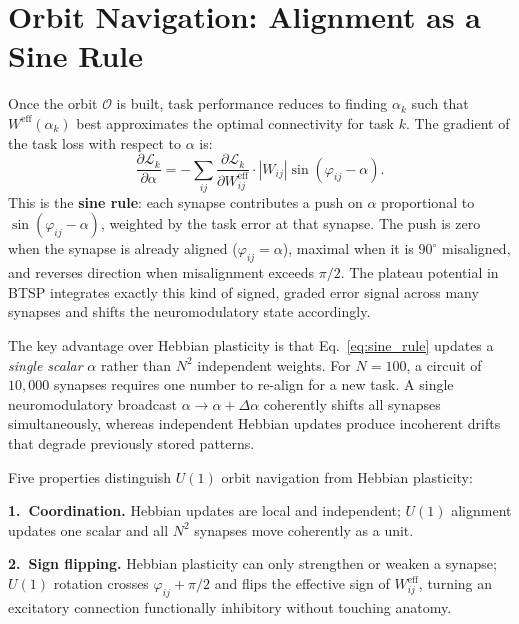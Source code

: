 \documentclass[11pt]{article}
\begin{document}
\section{Orbit Navigation: Alignment as a Sine Rule}

Once the orbit $\mathcal{O}$ is built, task performance reduces to
finding $\alpha_k$ such that $W^{\text{eff}}(\alpha_k)$ best
approximates the optimal connectivity for task $k$. The gradient
of the task loss with respect to $\alpha$ is:
\begin{equation}
\frac{\partial \mathcal{L}_k}{\partial \alpha} =
-\sum_{ij} \frac{\partial \mathcal{L}_k}{\partial W_{ij}^{\text{eff}}}
\cdot |W_{ij}|\sin(\varphi_{ij} - \alpha).
\label{eq:sine_rule}
\end{equation}
This is the \textbf{sine rule}: each synapse contributes a push on
$\alpha$ proportional to $\sin(\varphi_{ij} - \alpha)$, weighted by
the task error at that synapse. The push is zero when the synapse is
already aligned ($\varphi_{ij} = \alpha$), maximal when it is
$90^{\circ}$ misaligned, and reverses direction when misalignment
exceeds $\pi/2$. The plateau potential in BTSP integrates exactly
this kind of signed, graded error signal across many synapses and
shifts the neuromodulatory state accordingly.

The key advantage over Hebbian plasticity is that
Eq.~\eqref{eq:sine_rule} updates a \emph{single scalar} $\alpha$
rather than $N^2$ independent weights. For $N=100$, a circuit of
$10{,}000$ synapses requires one number to re-align for a new task.
A single neuromodulatory broadcast $\alpha \to \alpha + \Delta\alpha$
coherently shifts all synapses simultaneously, whereas independent
Hebbian updates produce incoherent drifts that degrade previously
stored patterns.

Five properties distinguish $U(1)$ orbit navigation from Hebbian
plasticity:

\textbf{1.~Coordination.} Hebbian updates are local and independent;
$U(1)$ alignment updates one scalar and all $N^2$ synapses move
coherently as a unit.

\textbf{2.~Sign flipping.} Hebbian plasticity can only strengthen
or weaken a synapse; $U(1)$ rotation crosses $\varphi_{ij} + \pi/2$
and flips the effective sign of $W_{ij}^{\text{eff}}$, turning an
excitatory connection functionally inhibitory without touching anatomy.
\end{document}
